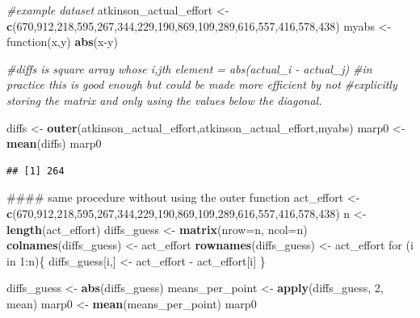 \documentclass[]{book}
\newenvironment{Shaded}{\begin{snugshade}}{\end{snugshade}}
\newcommand{\KeywordTok}[1]{\textcolor[rgb]{0.13,0.29,0.53}{\textbf{{#1}}}}
\newcommand{\DataTypeTok}[1]{\textcolor[rgb]{0.13,0.29,0.53}{{#1}}}
\newcommand{\DecValTok}[1]{\textcolor[rgb]{0.00,0.00,0.81}{{#1}}}
\newcommand{\StringTok}[1]{\textcolor[rgb]{0.31,0.60,0.02}{{#1}}}
\newcommand{\CommentTok}[1]{\textcolor[rgb]{0.56,0.35,0.01}{\textit{{#1}}}}
\newcommand{\NormalTok}[1]{{#1}}
\begin{document}
\begin{Shaded}
\begin{Highlighting}[]
\CommentTok{#example dataset}
\NormalTok{atkinson_actual_effort <-}
\StringTok{  }\KeywordTok{c}\NormalTok{(}\DecValTok{670}\NormalTok{,}\DecValTok{912}\NormalTok{,}\DecValTok{218}\NormalTok{,}\DecValTok{595}\NormalTok{,}\DecValTok{267}\NormalTok{,}\DecValTok{344}\NormalTok{,}\DecValTok{229}\NormalTok{,}\DecValTok{190}\NormalTok{,}\DecValTok{869}\NormalTok{,}\DecValTok{109}\NormalTok{,}\DecValTok{289}\NormalTok{,}\DecValTok{616}\NormalTok{,}\DecValTok{557}\NormalTok{,}\DecValTok{416}\NormalTok{,}\DecValTok{578}\NormalTok{,}\DecValTok{438}\NormalTok{)}
\NormalTok{myabs <-}\StringTok{ }\NormalTok{function(x,y) }\KeywordTok{abs}\NormalTok{(x-y)}

\CommentTok{#diffs is square array whose i,jth element = abs(actual_i - actual_j)}
\CommentTok{#in practice this is good enough but could be made more efficient by not}
\CommentTok{#explicitly storing the matrix and only using the values below the diagonal.}

\NormalTok{diffs <-}\StringTok{ }\KeywordTok{outer}\NormalTok{(atkinson_actual_effort,atkinson_actual_effort,myabs)}
\NormalTok{marp0 <-}\StringTok{ }\KeywordTok{mean}\NormalTok{(diffs)}
\NormalTok{marp0}
\end{Highlighting}
\end{Shaded}

\begin{verbatim}
## [1] 264
\end{verbatim}

\begin{Shaded}
\begin{Highlighting}[]
\NormalTok{#### same procedure without using the outer function}
\NormalTok{act_effort <-}
\StringTok{  }\KeywordTok{c}\NormalTok{(}\DecValTok{670}\NormalTok{,}\DecValTok{912}\NormalTok{,}\DecValTok{218}\NormalTok{,}\DecValTok{595}\NormalTok{,}\DecValTok{267}\NormalTok{,}\DecValTok{344}\NormalTok{,}\DecValTok{229}\NormalTok{,}\DecValTok{190}\NormalTok{,}\DecValTok{869}\NormalTok{,}\DecValTok{109}\NormalTok{,}\DecValTok{289}\NormalTok{,}\DecValTok{616}\NormalTok{,}\DecValTok{557}\NormalTok{,}\DecValTok{416}\NormalTok{,}\DecValTok{578}\NormalTok{,}\DecValTok{438}\NormalTok{)}
\NormalTok{n <-}\StringTok{ }\KeywordTok{length}\NormalTok{(act_effort)}
\NormalTok{diffs_guess <-}\StringTok{ }\KeywordTok{matrix}\NormalTok{(}\DataTypeTok{nrow=}\NormalTok{n, }\DataTypeTok{ncol=}\NormalTok{n)}
\KeywordTok{colnames}\NormalTok{(diffs_guess) <-}\StringTok{ }\NormalTok{act_effort}
\KeywordTok{rownames}\NormalTok{(diffs_guess) <-}\StringTok{ }\NormalTok{act_effort }
\NormalTok{for (i in }\DecValTok{1}\NormalTok{:n)\{}
  \NormalTok{diffs_guess[i,] <-}\StringTok{ }\NormalTok{act_effort -}\StringTok{ }\NormalTok{act_effort[i]}
\NormalTok{\}}

\NormalTok{diffs_guess <-}\StringTok{ }\KeywordTok{abs}\NormalTok{(diffs_guess)}
\NormalTok{means_per_point <-}\StringTok{ }\KeywordTok{apply}\NormalTok{(diffs_guess, }\DecValTok{2}\NormalTok{, mean)}
\NormalTok{marp0 <-}\StringTok{ }\KeywordTok{mean}\NormalTok{(means_per_point)}
\NormalTok{marp0}
\end{Highlighting}
\end{Shaded}
\end{document}
